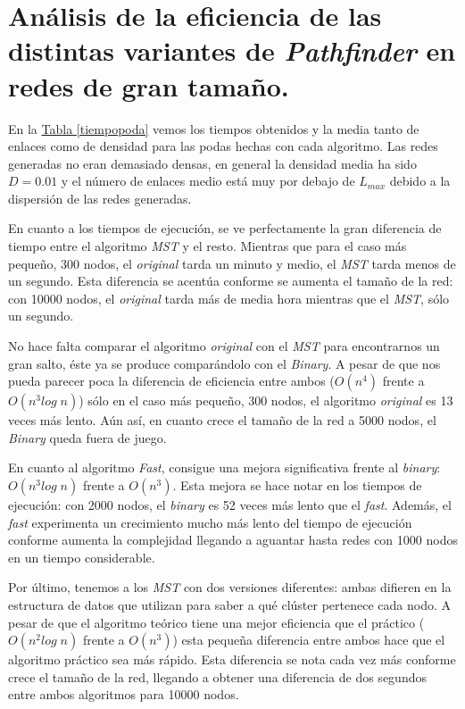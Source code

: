 \documentclass[10pt,a4paper,spanish]{article}
\numberwithin{equation}{section} %
\numberwithin{figure}{section} %
\numberwithin{table}{section} %
\begin{document}
\section{Análisis de la eficiencia de las distintas variantes de \textit{Pathfinder} en redes de gran tamaño.}
En la \hyperref[tiempopoda]{Tabla \ref*{tiempopoda}} vemos los tiempos obtenidos y la media tanto de enlaces como de densidad para las podas hechas con cada algoritmo. Las redes generadas no eran demasiado densas, en general la densidad media ha sido $D = 0.01$ y el número de enlaces medio está muy por debajo de $L_{max}$ debido a la dispersión de las redes generadas.

En cuanto a los tiempos de ejecución, se ve perfectamente la gran diferencia de tiempo entre el algoritmo \textit{MST} y el resto. Mientras que para el caso más pequeño, 300 nodos, el \textit{original} tarda un minuto y medio, el \textit{MST} tarda menos de un segundo. Esta diferencia se acentúa conforme se aumenta el tamaño de la red: con 10000 nodos, el \textit{original} tarda más de media hora mientras que el \textit{MST}, sólo un segundo. 

No hace falta comparar el algoritmo \textit{original} con el \textit{MST} para encontrarnos un gran salto, éste ya se produce comparándolo con el \textit{Binary}. A pesar de que nos pueda parecer poca la diferencia de eficiencia entre ambos ($O(n^4)$ frente a $O(n^3 log\; n)$) sólo en el caso más pequeño, 300 nodos, el algoritmo \textit{original} es 13 veces más lento. Aún así, en cuanto crece el tamaño de la red a 5000 nodos, el \textit{Binary} queda fuera de juego.

En cuanto al algoritmo \textit{Fast}, consigue una mejora significativa frente al \textit{binary}: $O(n^3 log\; n)$ frente a $O(n^3)$. Esta mejora se hace notar en los tiempos de ejecución: con 2000 nodos, el \textit{binary} es 52 veces más lento que el \textit{fast}. Además, el \textit{fast} experimenta un crecimiento mucho más lento del tiempo de ejecución conforme aumenta la complejidad llegando a aguantar hasta redes con 1000 nodos en un tiempo considerable. 

Por último, tenemos a los \textit{MST} con dos versiones diferentes: ambas difieren en la estructura de datos que utilizan para saber a qué clúster pertenece cada nodo. A pesar de que el algoritmo teórico tiene una mejor eficiencia que el práctico ($O(n^2 log\;n)$ frente a $O(n^3)$) esta pequeña diferencia entre ambos hace que el algoritmo práctico sea más rápido. Esta diferencia se nota cada vez más conforme crece el tamaño de la red, llegando a obtener una diferencia de dos segundos entre ambos algoritmos para 10000 nodos.
\end{document}
